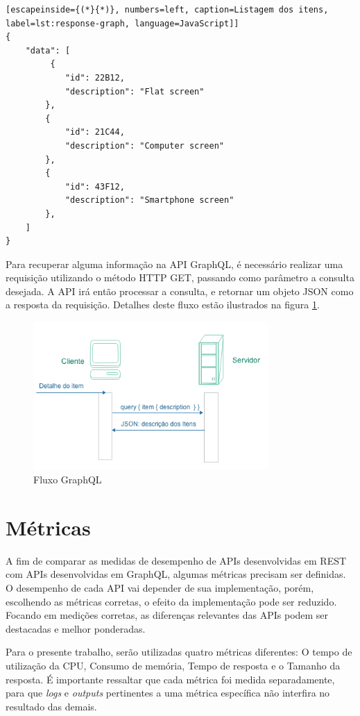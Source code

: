 \begin{lstlisting}[escapeinside={(*}{*)}, numbers=left, caption=Listagem dos itens, label=lst:response-graph, language=JavaScript]]
{
    "data": [
         {
            "id": 22B12,
            "description": "Flat screen"
        },
        {
            "id": 21C44,
            "description": "Computer screen"
        },
        {
            "id": 43F12,
            "description": "Smartphone screen"
        },
    ]
}

\end{lstlisting}

Para recuperar alguma informação na API GraphQL, é necessário realizar uma requisição utilizando o método HTTP GET, passando como parâmetro a consulta desejada. A API irá então processar a consulta, e retornar um objeto JSON como a resposta da requisição. Detalhes deste fluxo estão ilustrados na figura \ref{fig:graph-uml}.

\begin{figure}[htbp]
\centering
\includegraphics[width=0.8\textwidth]{figuras/uml-graph.png}
\caption{Fluxo GraphQL}
\label{fig:graph-uml}
\end{figure}

\section{Métricas}\label{sec:metrics}

A fim de comparar as medidas de desempenho de APIs desenvolvidas em REST com APIs desenvolvidas em GraphQL, algumas métricas precisam ser definidas. O desempenho de cada API vai depender de sua implementação, porém, escolhendo as métricas corretas, o efeito da implementação pode ser reduzido. Focando em medições corretas, as diferenças relevantes das APIs podem ser destacadas e melhor ponderadas.

Para o presente trabalho, serão utilizadas quatro métricas diferentes: O tempo de utilização da CPU, Consumo de memória, Tempo de resposta e o Tamanho da resposta. É importante ressaltar que cada métrica foi medida separadamente, para que \textit{logs} e \textit{outputs} pertinentes a uma métrica específica não interfira no resultado das demais.


